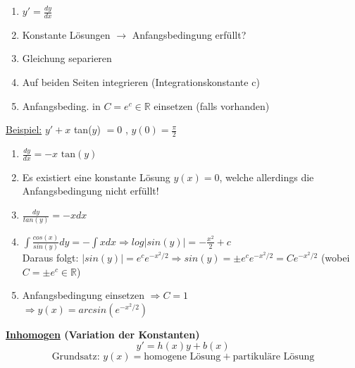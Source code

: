 \documentclass[6pt]{article}
\begin{document}
\begin{multicols*}{3}
	\begin{enumerate}[label=(\roman*), itemsep=2pt, parsep=3pt ]
		\item $y' = \frac{dy}{dx}$
		\item Konstante L{\"o}sungen  $\rightarrow$ Anfangsbedingung erf{\"u}llt?
		\item Gleichung separieren
		\item Auf beiden Seiten integrieren (Integrationskonstante c)
		\item Anfangsbeding. in $C = e^c \in \mathbb{R}$  einsetzen (falls vorhanden)
	\end{enumerate}
	
	\underline{Beispiel:} 	\hspace{5mm} 		$y' + x$ tan($y$) $= 0$ , $y(0)=\frac{\pi}{2}$ \\
	\begin{enumerate}[label=(\roman*), itemsep=2pt, parsep=3pt ]
		\item $ \frac{dy}{dx} = -x \text{ tan}(y)$
		\item Es existiert eine konstante L{\"o}sung $y(x) = 0$, welche allerdings die Anfangsbedingung nicht erf{\"u}llt!
		\item $\frac{dy}{tan(y)} = -xdx$
		\item  $\int \frac{cos(x)}{sin(y)}dy = - \int xdx \Rightarrow log |sin(y)| = -\frac{x^2}{2} + c$ \\
				Daraus folgt: $|sin(y)| = e^c e^{-x^2/2} \Rightarrow sin(y) = \pm e^c e^{-x^2/2} = Ce^{-x^2/2}$ (wobei $C = \pm e^c \in \mathbb{R}$)
		\item Anfangsbedingung einsetzen $\Rightarrow C=1$ \\
					$\Rightarrow y(x) = arcsin(e^{-x^2/2})$

	\end{enumerate}

	
	\columnbreak
	{\bf \underline{Inhomogen} (Variation der Konstanten)} \\
		\vspace{-2mm}
		\[ y' = h(x)y + b(x) \]
		\[ \text{Grundsatz: } y(x) = \text{homogene L{\"o}sung} + \text{partikul{\"a}re L{\"o}sung} \]
	

\end{multicols*}
\end{document}
